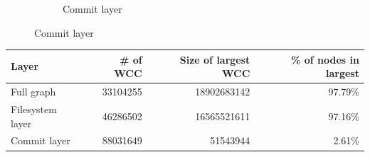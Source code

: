\documentclass[aspectratio=169,xcolor=table]{beamer}
\begin{document}
\begin{frame}
\begin{figure}
\begin{subfigure}{.49\textwidth}
                \caption{Commit layer}
            \end{subfigure}
        \end{figure}

        \begin{center}
            \begin{tabular}[t]{l r r r}
                \textbf{Layer} & \textbf{\# of WCC}
                               & \textbf{Size of largest WCC}
                               & \textbf{\% of nodes in largest}
                               \\
                               \hline
                Full graph       & \num{33104255}  & \num{18902683142} & 97.79\% \\
                Filesystem layer & \num{46286502}  & \num{16565521611} & 97.16\% \\
                Commit layer     & \num{88031649}  & \num{51543944}    & 2.61\% \\
            \end{tabular}
        \end{center}
    \end{frame}
\end{document}
